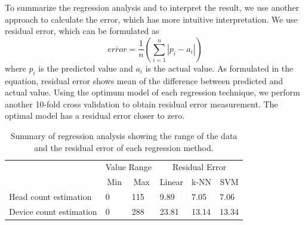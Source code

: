 







To summarize the regression analysis and to interpret the result, we use another approach to calculate the error, which has more intuitive interpretation. We use residual error, which can be formulated as
\begin{equation}\label{eq:residual-error}
	\bar { error } =\frac { 1 }{ n } \left( \sum _{ i=1 }^{ n }{ \left| { p }_{ i }-{ a }_{ i } \right|  }  \right) 
\end{equation}
where ${ p }_{ i }$ is the predicted value and ${ a }_{ i }$ is the actual value. As formulated in the equation, residual error shows mean of the difference between predicted and actual value. Using the optimum model of each regression technique, we perform another 10-fold cross validation to obtain residual error measurement. The optimal model has a residual error closer to zero.

\begin{table}[h]
\centering
\caption{Summary of regression analysis showing the range of the data and the residual error of each regression method.}
\label{tab:regression-summary}
\begin{tabular}{llllll}
\toprule
                   & \multicolumn{2}{c}{Value Range}                         & \multicolumn{3}{c}{Residual Error}                                                        \\
                   & \multicolumn{1}{c}{Min} & \multicolumn{1}{c}{Max} & \multicolumn{1}{c}{Linear} & \multicolumn{1}{c}{k-NN} & \multicolumn{1}{c}{SVM} \\ \midrule
Head count estimation   & 0                       & 115                     & 9.89                                  & 7.05                    & 7.06                    \\
Device count estimation & 0                       & 288                     & 23.81                                 & 13.14                   & 13.34                  \\ \bottomrule
\end{tabular}
\end{table}

